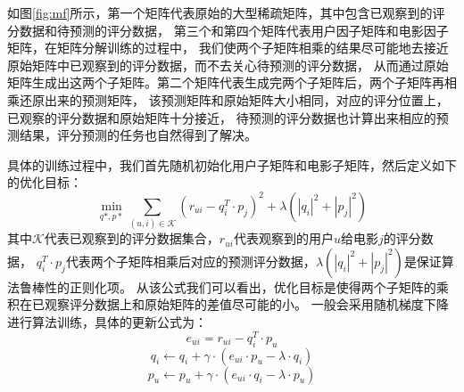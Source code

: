 如图\ref{fig:mf}所示，第一个矩阵代表原始的大型稀疏矩阵，其中包含已观察到的评分数据和待预测的评分数据，
第三个和第四个矩阵代表用户因子矩阵和电影因子矩阵，在矩阵分解训练的过程中，
我们使两个子矩阵相乘的结果尽可能地去接近原始矩阵中已观察到的评分数据，而不去关心待预测的评分数据，
从而通过原始矩阵生成出这两个子矩阵。第二个矩阵代表生成完两个子矩阵后，两个子矩阵再相乘还原出来的预测矩阵，
该预测矩阵和原始矩阵大小相同，对应的评分位置上，已观察的评分数据和原始矩阵十分接近，
待预测的评分数据也计算出来相应的预测结果，评分预测的任务也自然得到了解决。

具体的训练过程中，我们首先随机初始化用户子矩阵和电影子矩阵，然后定义如下的优化目标：
\begin{equation}
\min_{q*, p*} \sum_{(u, i) \in \mathcal{K} }{ (r_{ui} - q_i^T \cdot p_j)^2 + \lambda (|q_i|^2 + |p_j|^2) }
\end{equation}
其中$\mathcal{K}$代表已观察到的评分数据集合，$r_{ui}$代表观察到的用户$u$给电影$j$的评分数据，
$q_i^T \cdot p_j$代表两个子矩阵相乘后对应的预测评分数据，$\lambda (|q_i|^2 + |p_j|^2)$是保证算法鲁棒性的正则化项。
从该公式我们可以看出，优化目标是使得两个子矩阵的乘积在已观察评分数据上和原始矩阵的差值尽可能的小。
一般会采用随机梯度下降进行算法训练，具体的更新公式为：
\begin{equation}
e_{ui} = r_{ui} - q_i^T \cdot p_u
\end{equation}
\begin{equation}
q_i \leftarrow q_i + \gamma \cdot (e_{ui} \cdot p_u - \lambda \cdot q_i)
\end{equation}
\begin{equation}
p_u \leftarrow p_u + \gamma \cdot (e_{ui} \cdot q_i - \lambda \cdot p_u)
\end{equation}

